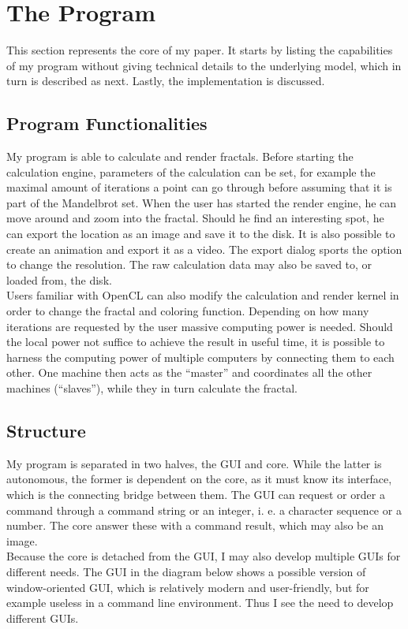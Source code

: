 \documentclass[10pt,a4paper,titlepage]{article}
\begin{document}
	\section{The Program}
	This section represents the core of my paper. It starts by listing the capabilities of my program without giving technical details to the underlying model, which in turn is described as next. Lastly, the implementation is discussed.
	\subsection{Program Functionalities}
	My program is able to calculate and render fractals. Before starting the calculation engine, parameters of the calculation can be set, for example the maximal amount of iterations a point can go through before assuming that it is part of the Mandelbrot set. When the user has started the render engine, he can move around and zoom into the fractal. Should he find an interesting spot, he can export the location as an image and save it to the disk. It is also possible to create an animation and export it as a video. The export dialog sports the option to change the resolution. The raw calculation data may also be saved to, or loaded from, the disk.\\
	Users familiar with OpenCL can also modify the calculation and render kernel in order to change the fractal and coloring function. Depending on how many iterations are requested by the user massive computing power is needed. Should the local power not suffice to achieve the result in useful time, it is possible to harness the computing power of multiple computers by connecting them to each other. One machine then acts as the ``master'' and coordinates all the other machines (``slaves''), while they in turn calculate the fractal.
	
	\subsection{Structure}
	My program is separated in two halves, the GUI and core. While the latter is autonomous, the former is dependent on the core, as it must know its interface, which is the connecting bridge between them. The GUI can request or order a command through a command string or an integer, i. e. a character sequence or a number. The core answer these with a command result, which may also be an image.\\
	Because the core is detached from the GUI, I may also develop multiple GUIs for different needs. The GUI in the diagram below shows a possible version of window-oriented GUI, which is relatively modern and user-friendly, but for example useless in a command line environment. Thus I see the need to develop different GUIs.
	
\end{document}
